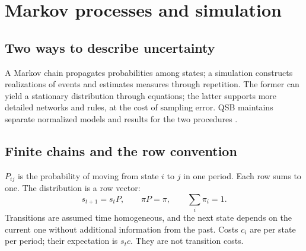 \chapter{Markov processes and simulation}
\label{ch:markov-simulacion}

\section{Two ways to describe uncertainty}
A Markov chain propagates probabilities among states; a simulation constructs
realizations of events and estimates measures through repetition. The former
can yield a stationary distribution through equations; the latter supports
more detailed networks and rules, at the cost of sampling error. QSB maintains
separate normalized models and results for the two procedures
\cite{ross2019introduction,law2015simulation}.

\section{Finite chains and the row convention}
\(P_{ij}\) is the probability of moving from state \(i\) to \(j\) in one
period. Each row sums to one. The distribution is a row vector:
\[
 s_{t+1}=s_tP,\qquad \pi P=\pi,\qquad \sum_i\pi_i=1.
\]
Transitions are assumed time homogeneous, and the next state depends on the
current one without additional information from the past. Costs \(c_i\) are
per state per period; their expectation is \(s_tc\). They are not transition
costs.

